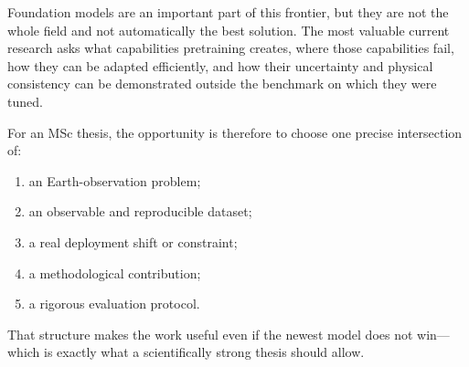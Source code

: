 \documentclass[
  a4paper,
  11pt]{article}
\providecommand{\tightlist}{%
  \setlength{\itemsep}{0pt}\setlength{\parskip}{0pt}}
\begin{document}
Foundation models are an important part of this frontier, but they are
not the whole field and not automatically the best solution. The most
valuable current research asks what capabilities pretraining creates,
where those capabilities fail, how they can be adapted efficiently, and
how their uncertainty and physical consistency can be demonstrated
outside the benchmark on which they were tuned.

For an MSc thesis, the opportunity is therefore to choose one precise
intersection of:

\begin{enumerate}
\def\labelenumi{\arabic{enumi}.}
\tightlist
\item
  an Earth-observation problem;
\item
  an observable and reproducible dataset;
\item
  a real deployment shift or constraint;
\item
  a methodological contribution;
\item
  a rigorous evaluation protocol.
\end{enumerate}

That structure makes the work useful even if the newest model does not
win---which is exactly what a scientifically strong thesis should allow.
\end{document}

